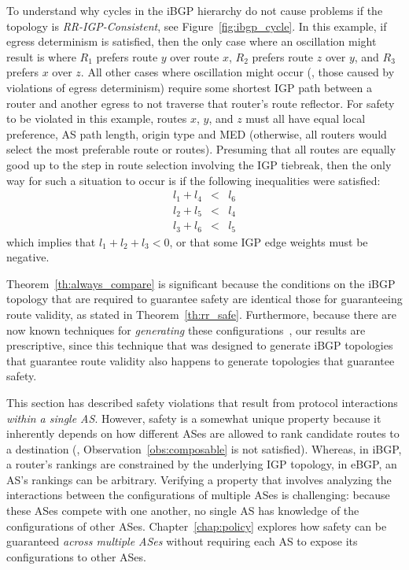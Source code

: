 To understand why cycles in the iBGP hierarchy do not cause problems if
the topology is {\em 
RR-IGP-Consistent}, see Figure~\ref{fig:ibgp_cycle}.  In this example,
if egress determinism is satisfied, then the only case where an
oscillation might result is where $R_1$ prefers route $y$ over route
$x$, $R_2$ prefers route $z$ over $y$, and $R_3$ prefers $x$ over $z$.
All other cases where oscillation might occur (\ie, those caused by
violations of egress determinism) require some shortest IGP path between
a router and another egress to not traverse that router's route reflector.
For safety to be violated in this example, routes $x$, $y$, and $z$ must
all have equal local preference, AS path length, origin type and MED
(otherwise, all routers would select the most preferable route or
routes).  Presuming that all routes are equally good up to the step in
route selection involving the IGP tiebreak, then the only way for such a
situation to occur is if the following inequalities were satisfied:
\begin{eqnarray*}
l_1 + l_4 & < & l_6 \\
l_2 + l_5 & < & l_4 \\
l_3 + l_6 & < & l_5 
\end{eqnarray*}
which implies that $l_1 + l_2 + l_3 < 0$, or that some IGP edge weights
must be negative.

Theorem~\ref{th:always_compare} is significant because
the conditions on the iBGP topology that are required to guarantee
safety are identical those for guaranteeing route validity, as stated in
Theorem~\ref{th:rr_safe}.  Furthermore, because there are now known
techniques for {\em generating} these
configurations~\cite{Vutukuru2005}, our results are prescriptive, since
this technique that was designed to generate iBGP topologies that
guarantee route validity also happens to generate topologies that
guarantee safety.

This section has described safety violations that result from
protocol interactions {\em within a single AS}.  However, safety is a somewhat
unique property because it inherently depends on how different ASes are
allowed to rank candidate routes to a destination (\ie,
Observation~\ref{obs:composable} is not satisfied).  Whereas, in iBGP, a
router's rankings are constrained by the underlying IGP
topology, in eBGP, an AS's rankings can be arbitrary.
Verifying a property that involves analyzing the interactions
between the configurations of multiple ASes is challenging:
because these ASes compete with one another, no single AS has knowledge 
of the configurations of other ASes.  Chapter~\ref{chap:policy} explores
how safety can be guaranteed {\em across multiple ASes} without
requiring each AS to expose its configurations to other ASes.


